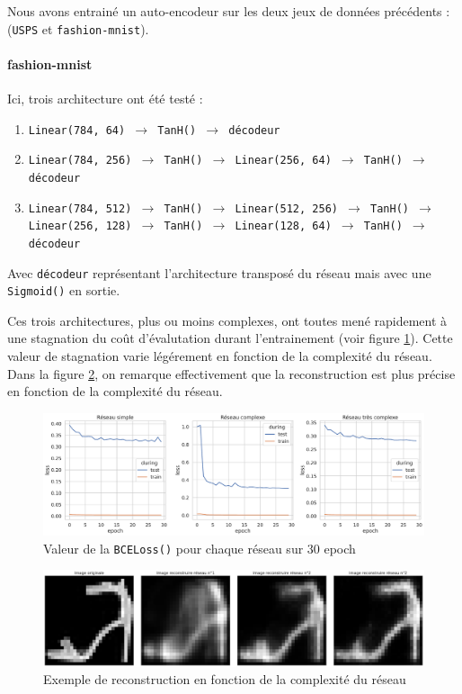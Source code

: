 \documentclass{article}
\begin{document}
Nous avons entrainé un auto-encodeur sur les deux jeux de données précédents : (\texttt{USPS} et \texttt{fashion-mnist}). 
\paragraph*{fashion-mnist} 
Ici, trois architecture ont été testé : \begin{enumerate}
    \item \texttt{Linear(784, 64) $\rightarrow$ TanH() $\rightarrow$ décodeur}
    \item \texttt{Linear(784, 256) $\rightarrow$ TanH() $\rightarrow$ Linear(256, 64) $\rightarrow$ TanH() $\rightarrow$ décodeur}
    \item \texttt{Linear(784, 512) $\rightarrow$ TanH() $\rightarrow$ Linear(512, 256) $\rightarrow$ TanH() $\rightarrow$ Linear(256, 128) $\rightarrow$ TanH() $\rightarrow$ Linear(128, 64) $\rightarrow$ TanH() $\rightarrow$ décodeur}
\end{enumerate}
Avec \texttt{décodeur} représentant l'architecture transposé du réseau mais avec une \texttt{Sigmoid()} en sortie. 

Ces trois architectures, plus ou moins complexes, ont toutes mené rapidement à une stagnation du coût d'évalutation durant l'entrainement (voir figure \ref*{fig:lossencoder}). Cette valeur de stagnation varie légérement en fonction de la complexité du réseau. Dans la figure \ref*{fig:reconstruction}, on remarque effectivement que la reconstruction est plus précise en fonction de la complexité du réseau. 

\begin{figure}[htbp]
    \centering
    \includegraphics*[width=.75\textwidth]{loss_encoder_fashion_3_networks.pdf}
    \caption{Valeur de la \texttt{BCELoss()} pour chaque réseau sur 30 epoch}
    \label{fig:lossencoder}
\end{figure}

\begin{figure}[htbp]
    \centering
    \includegraphics*[width=.75\textwidth]{reconstruction_per_network_cplxity.pdf}
    \caption{Exemple de reconstruction en fonction de la complexité du réseau}
    \label{fig:reconstruction}
\end{figure}
\end{document}
